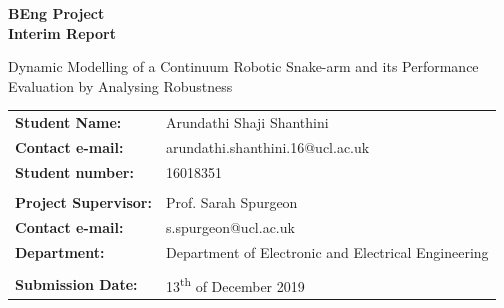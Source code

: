 \documentclass[a4paper,12pt]{report}
\author{Arundathi Shaji Shanthini}
\begin{document}
\begin{titlepage}
    \setlength{\voffset}{-1.8in}
    \noindent \noindent {}
    
    \vspace{30mm}

    \begin{center}
        {\LARGE \textbf{BEng Project}}\\
        \vspace{4mm}
        {\Huge \textbf{Interim Report}}
    \end{center}
    
    \vspace{10mm}
    
    \begin{center}
    \begin{spacing}{1.8}
    {\LARGE
   Dynamic Modelling of a Continuum Robotic Snake-arm and its Performance Evaluation by Analysing Robustness}
    \end{spacing}
    \end{center}
    
    \vspace{18mm}
    
     \begin{tabular}{ll}
        \textbf{Student Name:}  & \hspace{4mm} Arundathi Shaji Shanthini \\
       \textbf{Contact e-mail:} & \hspace{4mm} arundathi.shanthini.16@ucl.ac.uk \\
        \textbf{Student number:} & \hspace{4mm} 16018351 \\ \\ 
        \textbf{Project Supervisor:}  & \hspace{4mm} Prof. Sarah Spurgeon \\
        \textbf{Contact e-mail:}  & \hspace{4mm} s.spurgeon@ucl.ac.uk \\
         \textbf{Department:} & \hspace{4mm} Department of Electronic and Electrical Engineering\\ \\ 
          \textbf{Submission Date:} & \hspace{4mm} 13\textsuperscript{th} of December 2019
    \end{tabular}
\end{titlepage}
\end{document}
